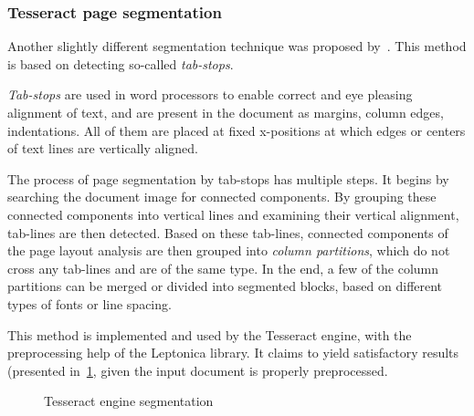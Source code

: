 \subsubsection{Tesseract page segmentation} \label{sectionTessPageSegm}

Another slightly different segmentation technique was proposed by~\citet{tesseractSegmentationTab}. This method is based on detecting so-called \emph{tab-stops}.

\emph{Tab-stops} are used in word processors to enable correct and eye pleasing alignment of text, and are present in the document as margins, column edges, indentations. All of them are placed at fixed x-positions at which edges or centers of text lines are vertically aligned.

The process of page segmentation by tab-stops has multiple steps. It begins by searching the document image for connected components. By grouping these connected components into vertical lines and examining their vertical alignment, tab-lines are then detected. Based on these tab-lines, connected components of the page layout analysis are then grouped into \emph{column partitions}, which do not cross any tab-lines and are of the same type. In the end, a few of the column partitions can be merged or divided into segmented blocks, based on different types of fonts or line spacing. 

This method is implemented and used by the Tesseract engine, with the preprocessing help of the Leptonica library. It claims to yield satisfactory results (presented in~\cref{fig:segmentationTesseract}, given the input document is properly preprocessed.

\begin{figure}
    \noindent
	\caption{Tesseract engine segmentation}
	\label{fig:segmentationTesseract}
\end{figure}

